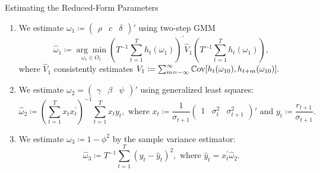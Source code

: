 \documentclass[smaller, aspectratio=169]{beamer}
\begin{document}
\begin{frame}[c]{Estimating the Reduced-Form Parameters}


  \begin{enumerate}
  \item We estimate $\omega_1 \coloneqq \begin{pmatrix} \rho & c & \delta \end{pmatrix}'$ using two-step GMM
%
      \begin{equation*}
        \widehat{\omega}_{1} \coloneqq \underset{\omega_{1}\in O_{1}}{\arg \min}\left(T^{-1}\sum_{t = 1}^{T}h_{t}(\omega_{1})\right)^{\prime}\widehat{V}_{1}\left(T^{-1}\sum_{t=1}^{T}h_{t}(\omega_{1})\right), 
      \end{equation*}
      where $\widehat{V}_{1}$ consistently estimates $V_{1} \coloneqq \sum_{m=-\infty}^{\infty}\mathbb{C}\mathrm{ov}[h_{t}(\omega_{10}), h_{t+m}(\omega_{10})].$
%
      \bigskip
%
  \item We estimate $\omega_{2} = \begin{pmatrix} \gamma & \beta & \psi \end{pmatrix}'$ using generalized least squares: 
%
      \begin{equation*}
        \widehat{\omega}_{2} \coloneqq \left( \sum_{t=1}^{T}x_{t}x_{t}^{\prime}\right)^{-1}\sum_{t=1}^{T}x_{t}y_{t}, \text{ where } 
x_{t} \coloneqq \frac{1}{\sigma_{t+1}} \begin{pmatrix} 1 & \sigma_{t}^{2} & \sigma_{t+1}^{2} \end{pmatrix}'  \text{ and } y_{t} \coloneqq \frac{r_{t+1}}{\sigma_{t+1}}. 
      \end{equation*}
%
      \bigskip
%
    \item We estimate $\omega_{3} \coloneqq 1 - \phi^2$ by the sample variance estimator:
%
      \begin{equation*}
        \widehat{\omega}_{3} \coloneqq T^{-1}\sum_{t=1}^{T}\left(y_{t}-\widehat{y}_{t}\right)^{2}, \text{ where } \widehat{y}_{t} = x_{t}^{\prime}\widehat{\omega}_{2}. 
      \end{equation*}
      
  \end{enumerate}
      

\end{frame}
\end{document}
